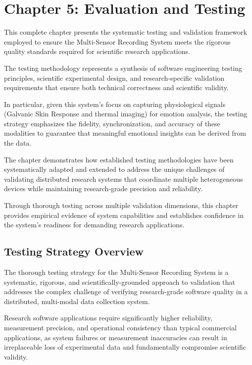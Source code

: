 \label{chap:5} \chapter{Chapter 5: Evaluation and Testing}

This complete chapter presents the systematic testing and validation framework
employed to ensure the Multi-Sensor Recording System meets the rigorous quality
standards required for scientific research applications.

The testing methodology represents a synthesis of software engineering
testing principles, scientific experimental design, and research-specific validation
requirements that ensure both technical correctness and scientific validity.

In particular, given this system's focus on capturing physiological signals (Galvanic
Skin Response and thermal imaging) for emotion analysis, the testing strategy
emphasizes the fidelity, synchronization, and accuracy of these modalities to
guarantee that meaningful emotional insights can be derived from the data.

The chapter demonstrates how established testing methodologies have been
systematically adapted and extended to address the unique challenges of validating
distributed research systems that coordinate multiple heterogeneous devices while
maintaining research-grade precision and reliability.

Through thorough testing across multiple validation dimensions, this chapter provides
empirical evidence of system capabilities and establishes confidence in the system's
readiness for demanding research applications.

\section{Testing Strategy Overview}

The thorough testing strategy for the Multi-Sensor Recording System is a systematic,
rigorous, and scientifically-grounded approach to validation that addresses the
complex challenge of verifying research-grade software quality in a distributed,
multi-modal data collection system.

Research software applications require significantly higher reliability, measurement
precision, and operational consistency than typical commercial applications, as
system failures or measurement inaccuracies can result in irreplaceable loss of
experimental data and fundamentally compromise scientific validity.

